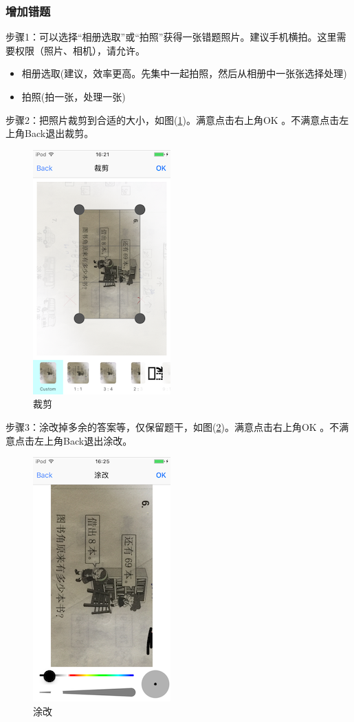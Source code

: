 \subsubsection{增加错题}
步骤1：可以选择“相册选取”或“拍照”获得一张错题照片。建议手机横拍。这里需要权限（照片、相机），请允许。
\begin{itemize}
	\item 相册选取(建议，效率更高。先集中一起拍照，然后从相册中一张张选择处理)
	\item 拍照(拍一张，处理一张)
\end{itemize}

步骤2：把照片裁剪到合适的大小，如图(\ref{img20})。满意点击右上角OK 。不满意点击左上角Back退出裁剪。

\begin{figure}[H]
	\centering
	\includegraphics{img/20.png}
	\caption{裁剪}
	\label{img20}
\end{figure}

步骤3：涂改掉多余的答案等，仅保留题干，如图(\ref{img21})。满意点击右上角OK 。不满意点击左上角Back退出涂改。
\begin{figure}[H]
	\centering
	\includegraphics{img/21.png}
	\caption{涂改}
	\label{img21}
\end{figure}

